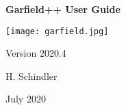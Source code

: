 \begin{titlepage}
  {
  \centering
  \sffamily
  \linespread{1.5}

  \vspace{3cm} 

  \huge{\textbf{Garfield++ User Guide}}

  \vspace{2cm}

  \texttt{[image: garfield.jpg]}

  \vspace{2cm}

  \large
  Version 2020.4 

  \vspace{2cm}
  \large
  H. Schindler

  \vfill

  July 2020

  }
\end{titlepage}
